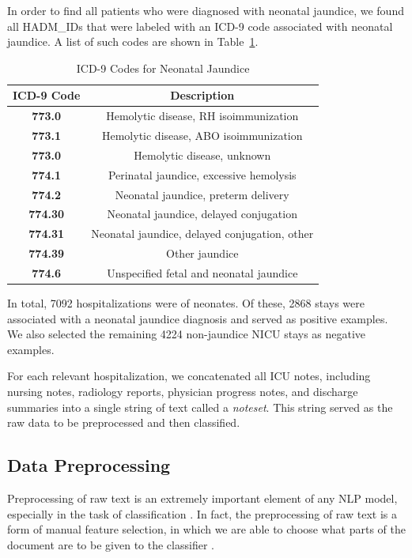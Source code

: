 \documentclass[conference]{IEEEtran}
\begin{document}
In order to find all patients who were diagnosed with neonatal jaundice, we found all HADM\_IDs that were labeled with an ICD-9 code associated with neonatal jaundice. A list of such codes are shown in Table~\ref{tab1}. 
\begin{table}[htbp]
\caption{ICD-9 Codes for Neonatal Jaundice}
\begin{center}
\begin{tabular}{cc}
\textbf{ICD-9 Code}&\textbf{Description} \\
\hline
\textbf{773.0} & Hemolytic disease, RH isoimmunization \\
\textbf{773.1} & Hemolytic disease, ABO isoimmunization \\
\textbf{773.0} & Hemolytic disease, unknown \\
\textbf{774.1} & Perinatal jaundice, excessive hemolysis \\
\textbf{774.2} & Neonatal jaundice, preterm delivery \\
\textbf{774.30} & Neonatal jaundice, delayed conjugation \\
\textbf{774.31} &  Neonatal jaundice, delayed conjugation, other \\
\textbf{774.39} & Other jaundice \\
\textbf{774.6} & Unspecified fetal and neonatal jaundice \\
\end{tabular}
\label{tab1}
\end{center}
\end{table}
In total, 7092 hospitalizations were of neonates. Of these, 2868 stays were associated with a neonatal jaundice diagnosis and served as positive examples. We also selected the remaining 4224 non-jaundice NICU stays as negative examples.

For each relevant hospitalization, we concatenated all ICU notes, including nursing notes, radiology reports, physician progress notes, and discharge summaries into a single string of text called a \textit{noteset}. This string served as the raw data to be preprocessed and then classified. 
\subsection{Data Preprocessing}\label{AA}
Preprocessing of raw text is an extremely important element of any NLP model, especially in the task of classification \cite{Haddi}. In fact, the preprocessing of raw text is a form of manual feature selection, in which we are able to choose what parts of the document are to be given to the classifier \cite{Fatih}.
\end{document}
